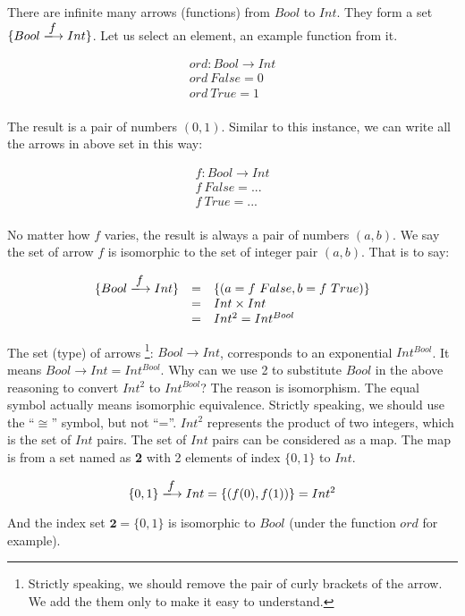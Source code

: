 \documentclass{article}
\begin{document}
\begin{example}
\normalfont
There are infinite many arrows (functions) from $Bool$ to $Int$. They form a set $\{Bool \arrowto{f} Int\}$. Let us select an element, an example function from it.

\[
\begin{array}{l}
ord : Bool \to Int \\
ord\ False = 0 \\
ord\ True = 1 \\
\end{array}
\]

The result is a pair of numbers $(0, 1)$. Similar to this instance, we can write all the arrows in above set in this way:

\[
\begin{array}{l}
f : Bool \to Int \\
f\ False = ... \\
f\ True = ... \\
\end{array}
\]

No matter how $f$ varies, the result is always a pair of numbers $(a, b)$. We say the set of arrow $f$ is isomorphic to the set of integer pair $(a, b)$. That is to say:

\[
\begin{array}{rcl}
\{Bool \arrowto{f} Int\} & = & \{(a = f\ False, b = f\ True)\} \\
  & = & Int \times Int \\
  & = & Int^2 = Int^{Bool}
\end{array}
\]

The set (type) of arrows \footnote{Strictly speaking, we should remove the pair of curly brackets of the arrow. We add the them only to make it easy to understand.}: $Bool \to Int$, corresponds to an exponential $Int^{Bool}$. It means $Bool \to Int = Int^{Bool}$. Why can we use 2 to substitute $Bool$ in the above reasoning to convert $Int^2$ to $Int^{Bool}$? The reason is isomorphism. The equal symbol actually means isomorphic equivalence. Strictly speaking, we should use the ``$\cong$'' symbol, but not ``=''. $Int^2$ represents the product of two integers, which is the set of $Int$ pairs. The set of $Int$ pairs can be considered as a map. The map is from a set named as \textbf{2} with 2 elements of index $\{0, 1\}$ to $Int$.

\[
\{0, 1\} \arrowto{f} Int = \{(f(0), f(1))\} = Int^2
\]

And the index set $\mathbf{2} = \{0, 1\}$ is isomorphic to $Bool$ (under the function $ord$ for example).
\end{example}
\end{document}
